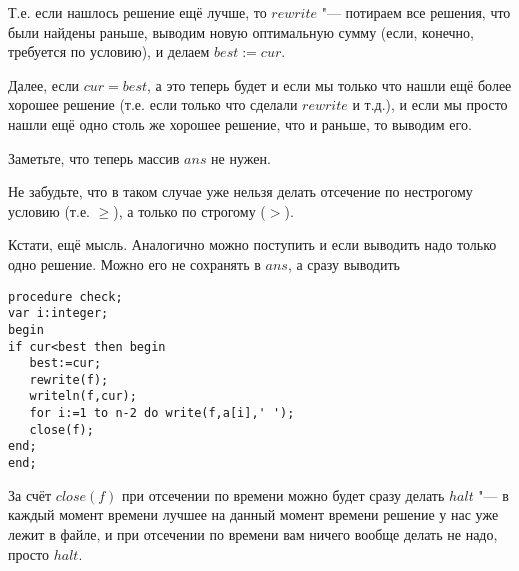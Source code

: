 Т.е. если нашлось решение ещё лучше, то $rewrite$ "--- потираем все решения, что 
были найдены раньше, выводим новую оптимальную сумму (если, конечно, 
требуется по условию), и делаем $best:=cur$. 

Далее, если $cur=best$, а это теперь будет и если мы только что нашли ещё более 
хорошее решение (т.е. если только что сделали $rewrite$ и т.д.), и если мы 
просто нашли ещё одно столь же хорошее решение, что и раньше, то выводим его.

Заметьте, что теперь массив $ans$ не нужен.

Не забудьте, что в таком случае уже нельзя делать отсечение по нестрогому 
условию (т.е. $\geq$), а только по строгому ($>$).

Кстати, ещё мысль. Аналогично можно поступить и если выводить надо 
только одно решение. Можно его не сохранять в $ans$, а сразу выводить

\begin{codesampleo}\begin{verbatim}
procedure check;
var i:integer;
begin
if cur<best then begin
   best:=cur;
   rewrite(f);
   writeln(f,cur);
   for i:=1 to n-2 do write(f,a[i],' ');
   close(f);
end;
end;
\end{verbatim}\end{codesampleo}

За счёт $close(f)$ при отсечении по времени можно будет сразу делать $halt$ "--- в 
каждый момент времени лучшее на данный момент времени решение у нас уже лежит в 
файле, и при отсечении по времени вам ничего вообще делать не надо, просто $halt$.


